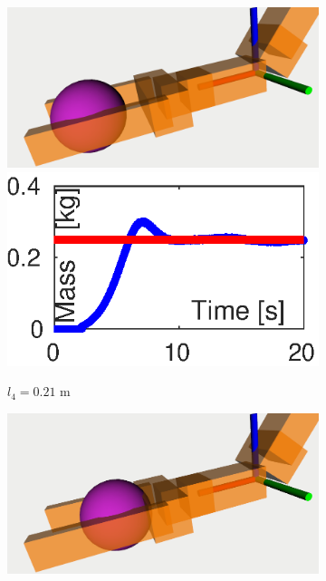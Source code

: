 \documentclass[conference,letterpaper]{ieeeconf}
\begin{document}
\begin{figure}
  \centering
  \begin{subfigure}{0.155\textwidth}
    \centering
    \includegraphics[width=\textwidth]{Figures/obj_position1.png}
    \includegraphics[width=\textwidth]{Figures/obj_position1.eps}
    \caption{$l_4=0.21$ m}
    \label{fig:obj_position1}
  \end{subfigure}
  \begin{subfigure}{0.155\textwidth}
    \centering
    \includegraphics[width=\textwidth]{Figures/obj_position2.png}

\end{subfigure}
\end{figure}
\end{document}
